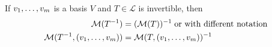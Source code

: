   \setcounter{thm}{85}
  \begin{thm}
    If $v_1, \dots, v_m$ is a basis $V$ and $T\in \mathcal{L}$ is invertible, then
    \begin{equation}
      \begin{aligned}
        \mathcal{M}(T^{-1}) & = (\mathcal{M}(T))^{-1} \; \text{or with different notation} \\
        \mathcal{M}(T^{-1}, (v_1, \dots, v_m)) & =\mathcal{M}(T, (v_1, \dots, v_m))^{-1}
      \end{aligned}
    \end{equation}
  \end{thm}